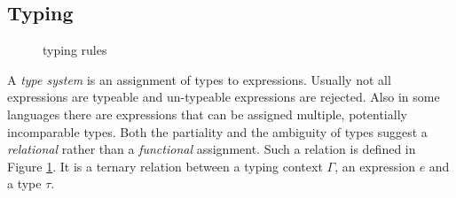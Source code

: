 {%
\subsection{Typing}\label{ssec:intro:typing}

\begin{figure}[t]
  \centering
  \caption{\stlcbool typing rules}
  \label{fig:intro:stlcbooltyping}
\end{figure}

A \emph{type system} is an assignment of types to expressions. Usually not all
expressions are typeable and un-typeable expressions are rejected. Also in some
languages there are expressions that can be assigned multiple, potentially
incomparable types. Both the partiality and the ambiguity of types suggest a
\emph{relational} rather than a \emph{functional} assignment. Such a relation is
defined in Figure \ref{fig:intro:stlcbooltyping}. It is a ternary relation
 between a typing context $\Gamma$,
an expression $e$ and a type $\tau$.

}
